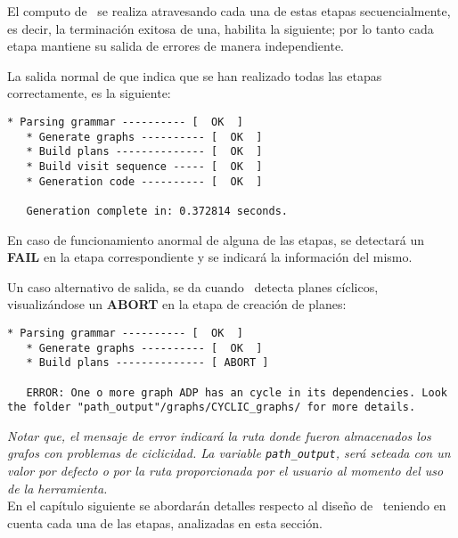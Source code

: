 El computo de \maggen\ se realiza atravesando cada una de estas etapas secuencialmente, es decir, la terminación exitosa de una, habilita la siguiente; por lo tanto cada etapa mantiene su salida de errores de manera independiente. 

La salida normal de \maggen que indica que se han realizado todas las etapas correctamente, es la siguiente:

\vspace{0.3cm}
\begin{lstlisting}[backgroundcolor=\color{white}, basicstyle=\footnotesize]
   * Parsing grammar ---------- [  OK  ]
   * Generate graphs ---------- [  OK  ]
   * Build plans -------------- [  OK  ]
   * Build visit sequence ----- [  OK  ]
   * Generation code ---------- [  OK  ]

   Generation complete in: 0.372814 seconds.
\end{lstlisting}
\vspace{0.3cm}

En caso de funcionamiento anormal de alguna de las etapas, se detectará un \textbf{FAIL} en la etapa correspondiente y se indicará la información del mismo.

Un caso alternativo de salida, se da cuando \maggen\ detecta planes cíclicos, visualizándose un \textbf{ABORT} en la etapa de creación de planes:

\vspace{0.3cm}
\begin{lstlisting}[backgroundcolor=\color{white}, basicstyle=\footnotesize] 
   * Parsing grammar ---------- [  OK  ]
   * Generate graphs ---------- [  OK  ]
   * Build plans -------------- [ ABORT ]

   ERROR: One o more graph ADP has an cycle in its dependencies. Look the folder "path_output"/graphs/CYCLIC_graphs/ for more details.
\end{lstlisting}
\vspace{0.3cm}

\textit{Notar que, el mensaje de error indicará la ruta donde fueron almacenados los grafos con problemas de ciclicidad. La variable \texttt{path\_output}, será seteada con un valor por defecto o por la ruta proporcionada por el usuario al momento del uso de la herramienta.}\\

En el capítulo siguiente se abordarán detalles respecto al diseño de \maggen\ teniendo en cuenta cada una de las etapas, analizadas en esta sección.
